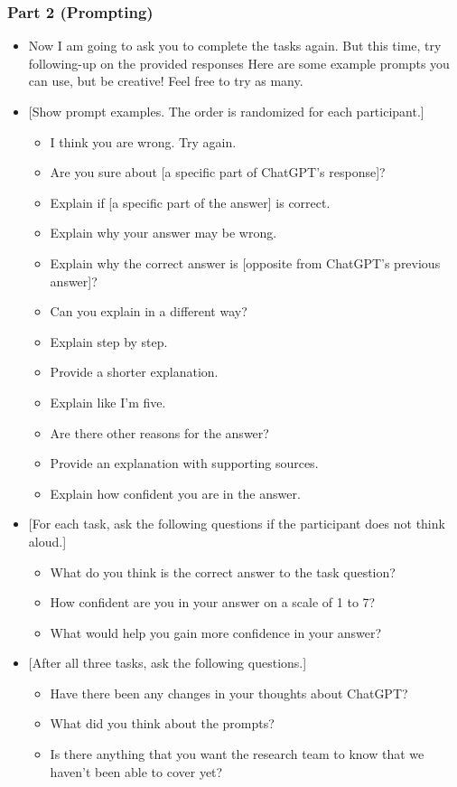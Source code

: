 \subsubsection*{Part 2 (Prompting)}
\begin{itemize}
    \item Now I am going to ask you to complete the tasks again. But this time, try following-up on the provided responses Here are some example prompts you can use, but be creative! Feel free to try as many.
    \item {[}Show prompt examples. The order is randomized for each participant.{]}
    \begin{itemize}
        \item I think you are wrong. Try again.
        \item Are you sure about [a specific part of ChatGPT’s response]?
        \item Explain if [a specific part of the answer] is correct.
        \item Explain why your answer may be wrong.
        \item Explain why the correct answer is [opposite from ChatGPT’s previous answer]? 
        \item Can you explain in a different way?
        \item Explain step by step.
        \item Provide a shorter explanation.
        \item Explain like I’m five.
        \item Are there other reasons for the answer?
        \item Provide an explanation with supporting sources.
        \item Explain how confident you are in the answer.
    \end{itemize}
    \item {[}For each task, ask the following questions if the participant does not think aloud.{]}
    \begin{itemize}
        \item What do you think is the correct answer to the task question?
        \item How confident are you in your answer on a scale of 1 to 7?
        \item What would help you gain more confidence in your answer?
    \end{itemize}
    \item {[}After all three tasks, ask the following questions.{]}
    \begin{itemize}
        \item Have there been any changes in your thoughts about ChatGPT?
        \item What did you think about the prompts?
        \item Is there anything that you want the research team to know that we haven’t been able to cover yet?
    \end{itemize}
\end{itemize}


